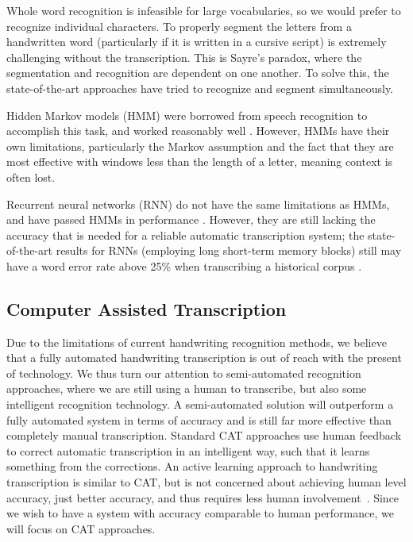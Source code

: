 \documentclass[ms]{byuprop}
\begin{document}
Whole word recognition is infeasible for large vocabularies, so we would prefer to recognize individual characters. To properly segment the letters from a handwritten word (particularly if it is written in a cursive script) is extremely challenging without the transcription. This is Sayre's paradox, where the segmentation and recognition are dependent on one another. \cite{sayres} To solve this, the state-of-the-art approaches have tried to recognize and segment simultaneously.

Hidden Markov models (HMM) were borrowed from speech recognition to accomplish this task, and worked reasonably well \cite{Marti2001}. However, HMMs have their own limitations, particularly the Markov assumption and the fact that they are most effective with windows less than the length of a letter, meaning context is often lost.

Recurrent neural networks (RNN) do not have the same limitations as HMMs, and have passed HMMs in performance \cite{Graves2009hmm}. However, they are still lacking the accuracy that is needed for a reliable automatic transcription system; the state-of-the-art results for RNNs (employing long short-term memory blocks) still may have a word error rate above 25\% when transcribing a historical corpus \cite{icdarComp2015}.

\subsection{Computer Assisted Transcription}

Due to the limitations of current handwriting recognition methods, we believe that a fully automated handwriting transcription is out of reach with the present of technology. We thus turn our attention to semi-automated recognition approaches, where we are still using a human to transcribe, but also some intelligent recognition technology. A semi-automated solution will outperform a fully automated system in terms of accuracy and is still far more effective than completely manual transcription. Standard CAT approaches use human feedback to correct automatic transcription in an intelligent way, such that it learns something from the corrections. An active learning approach to handwriting transcription is similar to CAT, but is not concerned about achieving human level accuracy, just better accuracy, and thus requires less human involvement~\cite{Serrano2010}. Since we wish to have a system with accuracy comparable to human performance, we will focus on CAT approaches.
\end{document}
